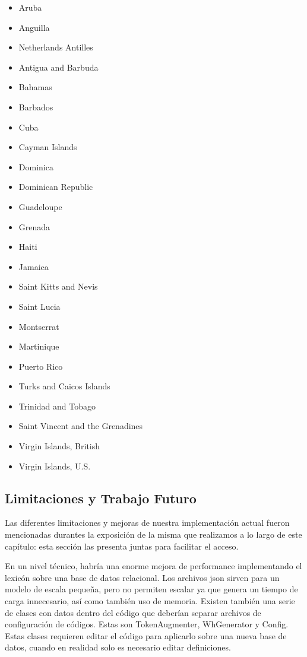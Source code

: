 \begin{itemize}
 \item Aruba
 \item Anguilla
 \item Netherlands Antilles
 \item Antigua and Barbuda
 \item Bahamas
 \item Barbados
 \item Cuba
 \item Cayman Islands
 \item Dominica
 \item Dominican Republic
 \item Guadeloupe
 \item Grenada
 \item Haiti
 \item Jamaica
 \item Saint Kitts and Nevis
 \item Saint Lucia
 \item Montserrat
 \item Martinique
 \item Puerto Rico
 \item Turks and Caicos Islands
 \item Trinidad and Tobago
 \item Saint Vincent and the Grenadines
 \item Virgin Islands, British
 \item Virgin Islands, U.S.
\end{itemize}


\subsection{Limitaciones y Trabajo Futuro}
\label{subsec:popescu-cierre}

Las diferentes limitaciones y mejoras de nuestra implementación actual fueron mencionadas durantes la exposición de la misma que realizamos a lo largo de este capítulo: esta sección las presenta juntas para facilitar el acceso.

En un nivel técnico, habría una enorme mejora de performance implementando el lexicón sobre una base de datos relacional. Los archivos json sirven para un modelo de escala pequeña, pero no permiten escalar ya que genera un tiempo de carga innecesario, así como también uso de memoria. Existen también una serie de clases con datos dentro del código que deberían separar archivos de configuración de códigos. Estas son TokenAugmenter, WhGenerator y Config. Estas clases requieren editar el código para aplicarlo sobre una nueva base de datos, cuando en realidad solo es necesario editar definiciones.

